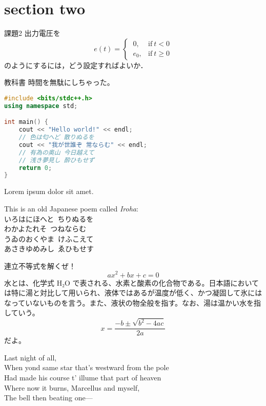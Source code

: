 \section{section two}

\begin{mytbox}{課題2}
	出力電圧を
	\begin{equation*}
		e(t) =
		\begin{cases}
			\ 0,   & \text{if}\ t < 0   \\
			\ e_0, & \text{if}\ t \ge 0
		\end{cases}
	\end{equation*}
	のようにするには，どう設定すればよいか．
\end{mytbox}

\begin{mytbox}{教科書}
	\kyokasho
	時間を無駄にしちゃった。
\end{mytbox}

\begin{lstlisting}[language=C++]
#include <bits/stdc++.h>
using namespace std;

int main() {
	cout << "Hello world!" << endl;
	// 色は匂へど 散りぬるを
	cout << "我が世誰ぞ 常ならむ" << endl;
	// 有為の奥山 今日越えて
	// 浅き夢見し 酔ひもせず
	return 0;
}
\end{lstlisting}

Lorem ipsum dolor sit amet.

This is an old Japanese poem called \emph{Iroha}: \\
いろはにほへと\ ちりぬるを \\
わかよたれそ\ つねならむ \\
うゐのおくやま\ けふこえて \\
あさきゆめみし\ ゑひもせす

連立不等式を解くぜ！
\begin{equation}
	ax^2 + bx + c = 0
\end{equation}
水とは、化学式 H₂O で表される、水素と酸素の化合物である。日本語においては特に湯と対比して用いられ、液体ではあるが温度が低く、かつ凝固して氷にはなっていないものを言う。また、液状の物全般を指す。なお、湯は温かい水を指していう。
\begin{equation}
	x = \frac{-b \pm \sqrt{b^2 - 4ac}}{2a}
\end{equation}
だよ。

Last night of all, \\
When yond same star that's westward from the pole \\
Had made his course t' illume that part of heaven \\
Where now it burns, Marcellus and myself, \\
The bell then beating one—

